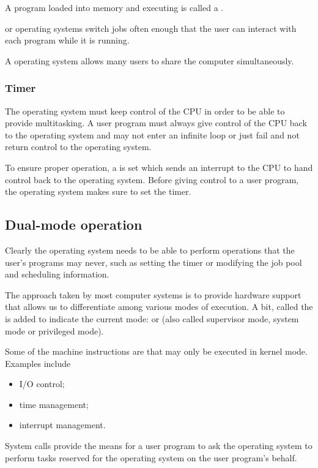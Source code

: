 A program loaded into memory and executing is called a .

 or  operating systems switch jobs often enough that the user can interact with each program while it is running.

A  operating system allows many users to share the computer simultaneously.

\subsubsection{Timer}
The operating system must keep control of the CPU in order to be able to provide multitasking. A user program must always give control of the CPU back to the operating system and may not enter an infinite loop or just fail and not return control to the operating system.

To ensure proper operation, a  is set which sends an interrupt to the CPU to hand control back to the operating system. Before giving control to a user program, the operating system makes sure to set the timer.

\subsection{Dual-mode operation}
Clearly the operating system needs to be able to perform operations that the user's programs may never, such as setting the timer or modifying the job pool and scheduling information.

The approach taken by most computer systems is to provide hardware support that allows us to differentiate among various modes of execution. A bit, called the  is added to indicate the current mode:  or  (also called supervisor mode, system mode or privileged mode).

Some of the machine instructions are  that may only be executed in kernel mode. Examples include
\begin{itemize}
\item I/O control;
\item time management;
\item interrupt management.
\end{itemize}
System calls provide the means for a user program to ask the operating system to perform tasks reserved for the operating system on the user program's behalf.

